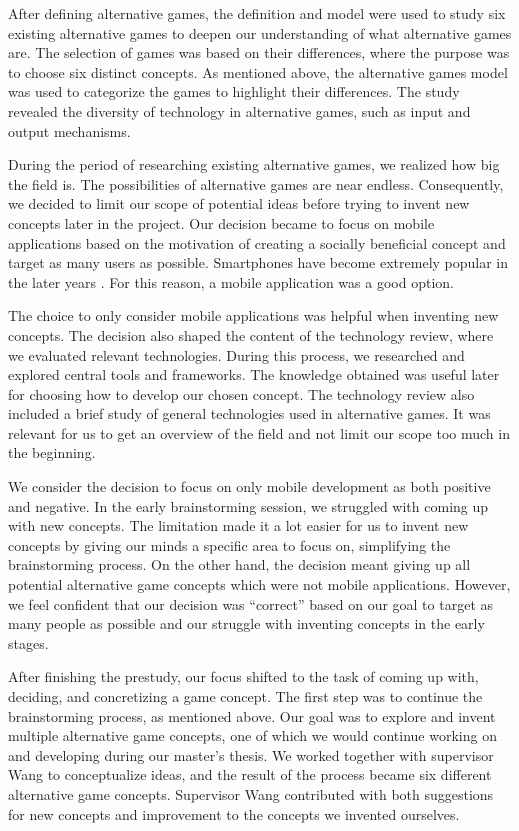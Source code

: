 \documentclass[../Main.tex]{subfiles}
\begin{document}
After defining alternative games, the definition and model were used to study six existing alternative games to deepen our understanding of what alternative games are. The selection of games was based on their differences, where the purpose was to choose six distinct concepts. As mentioned above, the alternative games model was used to categorize the games to highlight their differences. The study revealed the diversity of technology in alternative games, such as input and output mechanisms.

During the period of researching existing alternative games, we realized how big the field is. The possibilities of alternative games are near endless. Consequently, we decided to limit our scope of potential ideas before trying to invent new concepts later in the project. Our decision became to focus on mobile applications based on the motivation of creating a socially beneficial concept and target as many users as possible. Smartphones have become extremely popular in the later years \citep{odea_cell_2020}. For this reason, a mobile application was a good option.

The choice to only consider mobile applications was helpful when inventing new concepts. The decision also shaped the content of the technology review, where we evaluated relevant technologies. During this process, we researched and explored central tools and frameworks. The knowledge obtained was useful later for choosing how to develop our chosen concept. The technology review also included a brief study of general technologies used in alternative games. It was relevant for us to get an overview of the field and not limit our scope too much in the beginning.

We consider the decision to focus on only mobile development as both positive and negative. In the early brainstorming session, we struggled with coming up with new concepts. The limitation made it a lot easier for us to invent new concepts by giving our minds a specific area to focus on, simplifying the brainstorming process. On the other hand, the decision meant giving up all potential alternative game concepts which were not mobile applications. However, we feel confident that our decision was “correct” based on our goal to target as many people as possible and our struggle with inventing concepts in the early stages.

After finishing the prestudy, our focus shifted to the task of coming up with, deciding, and concretizing a game concept. The first step was to continue the brainstorming process, as mentioned above. Our goal was to explore and invent multiple alternative game concepts, one of which we would continue working on and developing during our master’s thesis. We worked together with supervisor Wang to conceptualize ideas, and the result of the process became six different alternative game concepts. Supervisor Wang contributed with both suggestions for new concepts and improvement to the concepts we invented ourselves.
\end{document}
